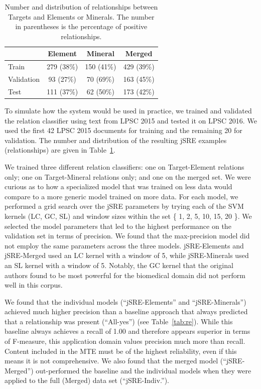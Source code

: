 \documentclass[letterpaper]{article} %
\begin{document}
\begin{table}[b]
\caption{Number and distribution of relationships between Targets and
Elements or Minerals. The number in parentheses is the percentage of
positive relationships. }
\label{tab:rels}
\begin{center}
\begin{tabular}{l|ccc}
           & Element & Mineral & Merged \\ \hline 
Train      & 279 (38\%) & 150 (41\%) & 429 (39\%) \\
Validation &  93 (27\%) &  70 (69\%) & 163 (45\%) \\ \hline
Test       & 111 (37\%) &  62 (50\%) & 173 (42\%) \\ \hline
\end{tabular}
\end{center}
\end{table}

To simulate how the system would be used in practice, we trained and
validated the relation classifier using text from LPSC 2015 and tested
it on LPSC 2016.  We used the first 42 LPSC 2015 documents for
training and the remaining 20 for validation.  The number and
distribution of the resulting jSRE examples (relationships) are given
in Table~\ref{tab:rels}.  

We trained three different relation classifiers: one on Target-Element
relations only; one on Target-Mineral relations only; and one on the
merged set.  We were curious as to how a specialized model that was
trained on less data would compare to a more generic model trained on
more data.  For each model, we performed a grid search over the jSRE
parameters by trying each of the SVM kernels (LC, GC, SL) and window
sizes within the set \{ 1, 2, 5, 10, 15, 20 \}.  We selected the model
parameters that led to the highest performance on the validation set
in terms of precision.  We found that the max-precision model did not
employ the same parameters across the three models.  jSRE-Elements and
jSRE-Merged used an LC kernel with a window of 5, while jSRE-Minerals
used an SL kernel with a window of 5.  Notably, the GC kernel that the
original authors found to be most powerful for the biomedical domain
did not perform well in this corpus.

We found that the individual models (``jSRE-Elements'' and
``jSRE-Minerals'') 
achieved much higher precision than a baseline approach that always
predicted that a relationship was present (``All-yes'') (see
Table~\ref{tab:re}).  While this baseline always achieves a recall of
1.00 and therefore appears superior in terms of F-measure, this
application domain values precision much more than recall.  Content
included in the MTE must be of the highest reliability, even if
this means it is not comprehensive.  
%
We also found that the merged model (``jSRE-Merged'') out-performed the
baseline and the individual models when they were applied to the full
(Merged) data set (``jSRE-Indiv.''). 
\end{document}
